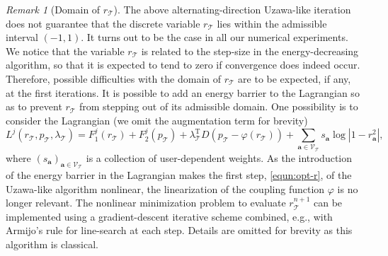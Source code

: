 \documentclass[a4paper,11pt]{article}
\theoremstyle{definition}
\theoremstyle{remark}
\newtheorem{remark}{Remark}[section]
\numberwithin{equation}{section}
\newcommand{\abs}[1]{\left\lvert#1\right\rvert}
\newcommand{\disr}{r_\calT}
\newcommand{\disp}{p_\calT}
\newcommand{\disLamb}{\lambda_\calT}
\newcommand{\ba}{{\boldsymbol a}}
\newcommand{\calT}{\mathcal{T}}
\newcommand{\calV}{\mathcal{V}}
\newcommand{\tr}{^{\mathrm{T}}}
\newcommand{\vertex}{\calV_\calT}
\begin{document}
\begin{remark}[Domain of $\disr$] \label{rem:domain}
The above alternating-direction Uzawa-like iteration does not guarantee that the discrete variable $\disr$ lies within the admissible interval $(-1,1)$. It turns out to be the case in all our numerical experiments. We notice that the variable $\disr$ is related to the step-size in the energy-decreasing algorithm, so that it is expected to tend to zero if convergence does indeed occur. Therefore, possible difficulties with the domain of $\disr$ are to be expected, if any, at the first iterations. It is possible to add an energy barrier to the Lagrangian so as to prevent $\disr$ from stepping out of its admissible domain. One possibility is to consider the Lagrangian (we omit the augmentation term for brevity)
\[
{L}^j(\disr,\disp,\disLamb)=F^j_1(\disr) + F^j_2(\disp) + \disLamb\tr  D (\disp-\varphi(\disr))  +  \sum_{\ba\in  \vertex} s_\ba \log\abs{1-r_\ba^2},
\] 
where $(s_\ba)_{\ba\in \vertex}$ is a collection of user-dependent weights. As the introduction of the energy barrier in the Lagrangian makes the first step, \eqref{equn:opt-r}, of the Uzawa-like algorithm nonlinear, the linearization of the coupling function $\varphi$ is no longer relevant. The nonlinear minimization problem to evaluate $\disr^{n+1}$ can be implemented using a gradient-descent iterative scheme combined, e.g., with Armijo's rule for line-search at each step. Details are omitted for brevity as this algorithm is classical. 
\end{remark}
\end{document}
